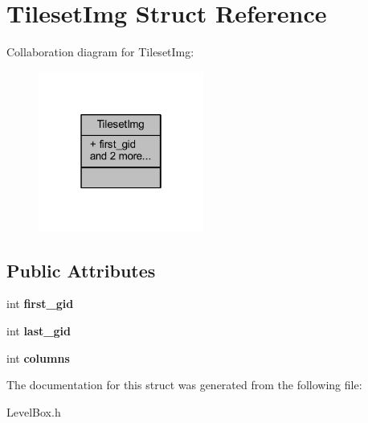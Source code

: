 \hypertarget{struct_tileset_img}{}\section{Tileset\+Img Struct Reference}
\label{struct_tileset_img}


Collaboration diagram for Tileset\+Img\+:\nopagebreak
\begin{figure}[H]
\begin{center}
\leavevmode
\includegraphics[width=154pt]{struct_tileset_img__coll__graph}
\end{center}
\end{figure}
\subsection*{Public Attributes}
\begin{DoxyCompactItemize}
\item 
\mbox{\label{struct_tileset_img_a5cb5a67d6afd202da1aafd53e509167c}} 
int {\bfseries first\+\_\+gid}
\item 
\mbox{\label{struct_tileset_img_a2cf02afb15fac885b30fd7d4d56374c1}} 
int {\bfseries last\+\_\+gid}
\item 
\mbox{\label{struct_tileset_img_a9bd1b96e5ce27e6cb778d9fb96138883}} 
int {\bfseries columns}
\end{DoxyCompactItemize}


The documentation for this struct was generated from the following file\+:\begin{DoxyCompactItemize}
\item 
Level\+Box.\+h\end{DoxyCompactItemize}
